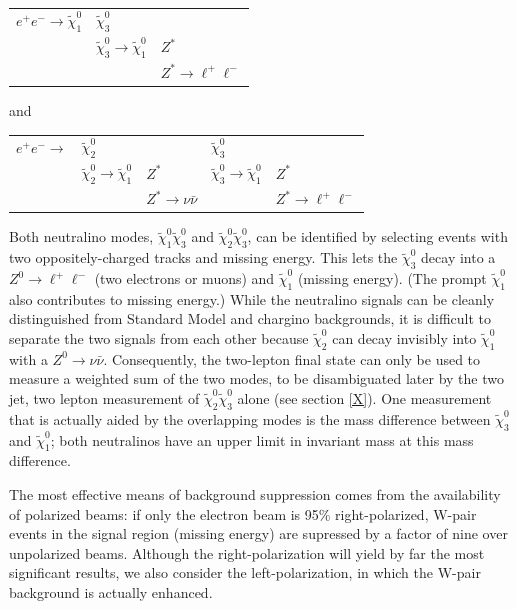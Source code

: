 \documentclass[12pt]{article}
\begin{document}
\begin{center}
  \begin{tabular}{l l l}
    $e^+e^- \to \tilde{\chi}^0_1$ & $\tilde{\chi}^0_3$ & \\
    & $\tilde{\chi}^0_3 \to \tilde{\chi}^0_1$ & $Z^*$ \\
    & & $Z^* \to \ell^+ \ell^-$
  \end{tabular}

\bigskip
and

\bigskip
  \begin{tabular}{l l l l l}
    $e^+e^- \to $ & $\tilde{\chi}^0_2$ & & $\tilde{\chi}^0_3$ & \\
    & $\tilde{\chi}^0_2 \to \tilde{\chi}^0_1$ & $Z^*$ & $\tilde{\chi}^0_3 \to \tilde{\chi}^0_1$ & $Z^*$ \\
    & & $Z^* \to \nu \bar{\nu}$ & & $Z^* \to \ell^+ \ell^-$
  \end{tabular}
\end{center}

\bigskip

Both neutralino modes, $\tilde{\chi}^0_1\tilde{\chi}^0_3$ and
$\tilde{\chi}^0_2\tilde{\chi}^0_3$, can be identified by selecting
events with two oppositely-charged tracks and missing energy.  This
lets the $\tilde{\chi}^0_3$ decay into a $Z^0 \to \ell^+\ell^-$ (two
electrons or muons) and $\tilde{\chi}^0_1$ (missing energy).  (The
prompt $\tilde{\chi}^0_1$ also contributes to missing energy.)  While
the neutralino signals can be cleanly distinguished from Standard
Model and chargino backgrounds, it is difficult to separate the two
signals from each other because $\tilde{\chi}^0_2$ can decay invisibly
into $\tilde{\chi}^0_1$ with a $Z^0 \to \nu \bar{\nu}$.  Consequently,
the two-lepton final state can only be used to measure a weighted sum
of the two modes, to be disambiguated later by the two jet, two lepton
measurement of $\tilde{\chi}^0_2\tilde{\chi}^0_3$ alone (see section
\ref{X}).  One measurement that is actually aided by the overlapping
modes is the mass difference between $\tilde{\chi}^0_3$ and
$\tilde{\chi}^0_1$; both neutralinos have an upper limit in invariant
mass at this mass difference.

The most effective means of background suppression comes from the
availability of polarized beams: if only the electron beam is 95\%
right-polarized, W-pair events in the signal region (missing energy)
are supressed by a factor of nine over unpolarized beams.  Although
the right-polarization will yield by far the most significant results,
we also consider the left-polarization, in which the W-pair background
is actually enhanced.
\end{document}
